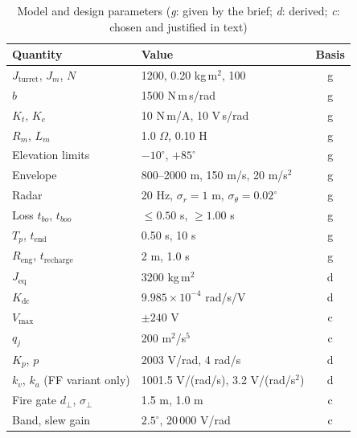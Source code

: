 \documentclass[conference]{IEEEtran}
\begin{document}
\begin{table}[t]
\centering\scriptsize
\caption{Model and design parameters (\emph{g}: given by the brief; \emph{d}: derived; \emph{c}: chosen and justified in text)}
\label{tab:par}
\begin{tabular}{@{}l l c@{}}
\toprule
Quantity & Value & Basis\\
\midrule
$J_{\mathrm{turret}}$, $J_m$, $N$      & 1200, 0.20 kg\,m$^2$, 100 & g\\
$b$                                    & 1500 N\,m\,s/rad         & g\\
$K_t$, $K_e$                           & 10 N\,m/A, 10 V\,s/rad   & g\\
$R_m$, $L_m$                           & 1.0 $\Omega$, 0.10 H     & g\\
Elevation limits                       & $-10^\circ$, $+85^\circ$ & g\\
Envelope                               & 800--2000 m, 150 m/s, 20 m/s$^2$ & g\\
Radar                                  & 20 Hz, $\sigma_r=1$ m, $\sigma_\theta=0.02^\circ$ & g\\
Loss $t_{bo}$, $t_{boo}$               & $\le0.50$ s, $\ge1.00$ s & g\\
$T_p$, $t_{\mathrm{end}}$              & 0.50 s, 10 s             & g\\
$R_{\mathrm{eng}}$, $t_{\mathrm{recharge}}$ & 2 m, 1.0 s          & g\\
\midrule
$J_{\mathrm{eq}}$                      & 3200 kg\,m$^2$           & d\\
$K_{\mathrm{dc}}$                      & $9.985\times10^{-4}$ rad/s/V & d\\
$V_{\max}$                             & $\pm240$ V               & c\\
$q_j$                                  & 200 m$^2$/s$^5$          & c\\
$K_p$, $p$                             & 2003 V/rad, 4 rad/s      & d\\
$k_v$, $k_a$ (FF variant only)         & 1001.5 V/(rad/s), 3.2 V/(rad/s$^2$) & d\\
Fire gate $d_\perp$, $\sigma_\perp$    & 1.5 m, 1.0 m             & c\\
Band, slew gain                        & $2.5^\circ$, 20\,000 V/rad & c\\
\bottomrule
\end{tabular}
\end{table}
\end{document}
